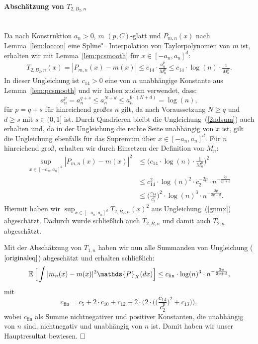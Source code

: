 \paragraph*{Abschätzung von $T_{2,B_2,n}$}\mbox{}\\
Da nach Konstruktion $a_n > 0$, $m$ $(p, C)$-glatt und $P_{m,n}(x)$ nach Lemma~\ref{lem:loccon} eine Spline"=Interpolation von Taylorpolynomen von $m$ ist, erhalten wir mit Lemma~\ref{lem:pcsmooth} für $x \in [-a_n,a_n]^d$:
\begin{equation}
\label{2ndsum}
\begin{split}
T_{2,B_2,n}(x) = |P_{m,n}(x) - m(x)| \leq c_{14} \cdot \frac{a_n^p}{M_n^p} \leq c_{14} \cdot \log(n) \cdot \frac{1}{M_n^p}.
\end{split}
\end{equation}
In dieser Ungleichung ist $c_{14} > 0$ eine von $n$ unabhängige Konstante aus Lemma~\ref{lem:pcsmooth} und wir haben zudem verwendet, dass:
$$a_n^p = a_n^{q + s} \leq a_n^{N + d} \leq a_n^{6 \cdot (N + d)} = \log(n),$$
für $p = q + s$ für hinreichend großes $n$ gilt, da nach Voraussetzung $N \geq q$ und $d \geq s$ mit $s \in (0, 1]$ ist.
Durch Quadrieren bleibt die Ungleichung~(\ref{2ndsum}) auch erhalten und, da in der Ungleichung die rechte Seite unabhängig von $x$ ist, gilt die Ungleichung ebenfalls für das Supremum über $x \in [-a_n,a_n]^d$. Für $n$ hinreichend groß, erhalten wir durch Einsetzen der Definition von $M_n$:
\begin{equation}
\label{4thsum}
\begin{split}
\sup_{x \in [-a_n, a_n]^d} |P_{m,n}(x) - m(x)|^2 & \leq \bigg(c_{14} \cdot \log(n) \cdot \frac{1}{M_n^p}\bigg)^2 \\
& \leq c_{14}^2 \cdot \log(n)^2 \cdot c_{2}^{-2p} \cdot n^{-\frac{2p}{2p + d}} \\
& \leq \bigg(\frac{c_{14}}{c_2^p}\bigg)^2 \cdot \log(n)^3 \cdot n^{-\frac{2p}{2p + d}}.
\end{split}
\end{equation}
Hiermit haben wir $\sup_{x \in [-a_n, a_n]^d} T_{2,B_2,n}(x)^2$ aus Ungleichung~(\ref{gnmx}) abgeschätzt.
Dadurch wurde schließlich auch $T_{2,B,n}$ und damit auch $T_{2,n}$ abgeschätzt.  

Mit der Abschätzung von $T_{1,n}$ haben wir nun alle Summanden von Ungleichung ($\ref{originaleq}$) abgeschätzt und erhalten schließlich:
\begin{equation*}
\E \Big[\int |m_n(x) - m(x)|^2 \mathds{P}_X(dx)\Big] \leq c_{\mathrm{fin}} \cdot \log(n)^3 \cdot n^{- \frac{2p}{2p + d}},
\end{equation*}
mit 
$$c_{\mathrm{fin}} = c_{5} + 2 \cdot c_{10} + c_{12} + 2 \cdot \Bigg(2 \cdot \bigg( \bigg(\frac{c_{14}}{c_2^p}\bigg)^2 +  c_{13}\bigg)\Bigg),$$
wobei $c_{\mathrm{fin}}$ als Summe nichtnegativer und positiver Konstanten, die unabhängig von $n$ sind, nichtnegativ und unabhängig von $n$ ist.
Damit haben wir unser Hauptresultat bewiesen. $\hfill\square$ 	